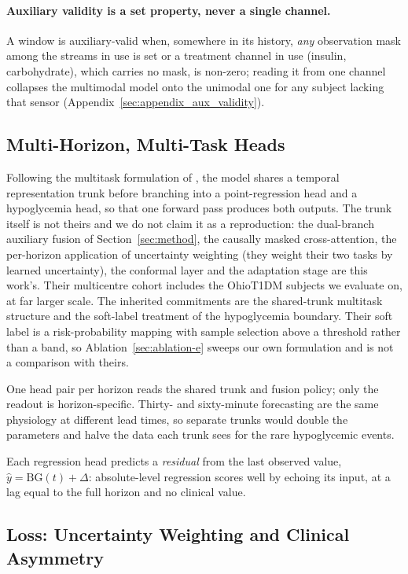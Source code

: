 \documentclass[pmlr,twocolumn,10pt]{jmlr}
\newcommand{\BG}{\mathrm{BG}}
\begin{document}
\paragraph{Auxiliary validity is a set property, never a single channel.} A window
is auxiliary-valid when, somewhere in its history, \emph{any} observation mask
among the streams in use is set or a treatment channel in use (insulin,
carbohydrate), which carries no mask, is non-zero; reading it from
one channel collapses the multimodal model onto the unimodal one for any subject
lacking that sensor (Appendix~\ref{sec:appendix_aux_validity}).

\subsection{Multi-Horizon, Multi-Task Heads}

Following the multitask formulation of \citet{fang2026glucose}, the model shares
a temporal representation trunk before branching into a point-regression head and
a hypoglycemia head, so that one forward pass produces both outputs. The trunk
itself is not theirs and we do not claim it as a reproduction: the dual-branch
auxiliary fusion of Section~\ref{sec:method}, the causally masked cross-attention,
the per-horizon application of uncertainty weighting (they weight their two
tasks by learned uncertainty), the conformal layer and the adaptation stage are
this work's. Their multicentre cohort includes the OhioT1DM subjects we evaluate
on, at far larger scale. The inherited commitments are the shared-trunk
multitask structure and the soft-label treatment of the hypoglycemia boundary.
Their soft label is a risk-probability mapping with sample selection above a
threshold rather than a band, so Ablation~\ref{sec:ablation-e} sweeps our own
formulation and is not a comparison with theirs.

One head pair per horizon reads the shared trunk and fusion policy; only the
readout is horizon-specific. Thirty- and sixty-minute forecasting are the same
physiology at different lead times, so separate trunks would double the
parameters and halve the data each trunk sees for the rare hypoglycemic events.

Each regression head predicts a \emph{residual} from the last observed value,
$\hat{y} = \BG(t) + \Delta$: absolute-level regression scores well by echoing
its input, at a lag equal to the full horizon and no clinical value.

\subsection{Loss: Uncertainty Weighting and Clinical Asymmetry}
\end{document}
